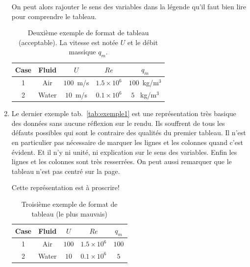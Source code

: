 \begin{enumerate}
		On peut alors rajouter le sens des variables dans la légende qu'il faut bien lire pour comprendre le tableau.
		
\begin{table}[htb]
\centering
{}
\begin{tabular}{c|cccc}
Case             & Fluid    & $U$               & $Re$                   &   $q_m$ \\ \hline\hline
1                & Air     & $100$~m/s        &   $1.5 \times 10^6$    &  $100$~kg/m$^3$                       \\
2                & Water   &  $10$~m/s        &   $0.1 \times 10^6$    &   $5$ ~kg/m$^3$      \\
\end{tabular}
\caption{Deuxième exemple de format de tableau (acceptable). La vitesse est notée $U$ et le débit massique $q_m$. }           
\label{tab:exemple2}   
\normalsize
{}
\end{table}
		
\item Le dernier exemple  tab.~\ref{tab:exemple1} est une représentation très basique des données sans aucune réflexion sur le rendu. Ils souffrent de tous les défauts possibles
	   qui sont le contraire des qualités du premier tableau. Il n'est en particulier pas nécessaire de marquer les lignes et
	   les colonnes quand c'est évident. Et il n'y ni unité, ni explication sur le sens des variables. Enfin les lignes et les colonnes sont très resserrées.
	   On peut aussi remarquer que le tableau n'est pas centré sur la page.
	   
	   Cette représentation est à proscrire!
	   
	   
\begin{table}[htb]
\begin{tabular}{|c|c|c|c|c|}
\hline
Case             & Fluid    & $U$          & $Re$                   &   $q_m$ \\ \hline
1                & Air     & $100$        &   $1.5 \times 10^6$    &  $100$    \\ \hline
2                & Water   &  $10$        &   $0.1 \times 10^6$    &   $5$      \\ \hline
\end{tabular}
\caption{Troisième exemple de format de tableau (le plus mauvais) }           
\label{tab:exemple3}   
\normalsize
{}
\end{table}
	   
\end{enumerate}


